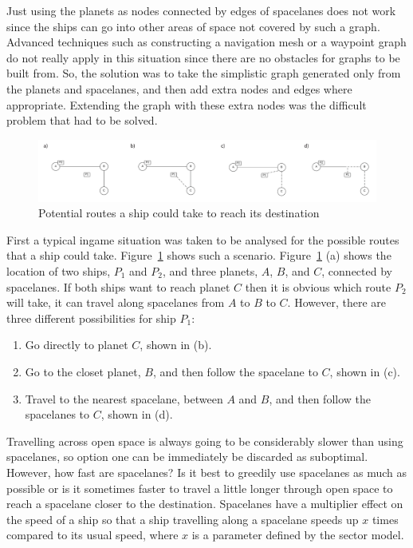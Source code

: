 Just using the planets as nodes connected by edges of spacelanes does not work since the ships can go into other areas of space not covered by such a graph. Advanced techniques such as constructing a navigation mesh or a waypoint graph do not really apply in this situation since there are no obstacles for graphs to be built from. So, the solution was to take the simplistic graph generated only from the planets and spacelanes, and then add extra nodes and edges where appropriate. Extending the graph with these extra nodes was the difficult problem that had to be solved.

\begin{figure}[h!]
	\includegraphics{res/pathfinding/PathFindingExample.pdf}
	\caption{Potential routes a ship could take to reach its destination}
	\label{fig:pathfindingexample}
\end{figure}

First a typical ingame situation was taken to be analysed for the possible routes that a ship could take. Figure~\ref{fig:pathfindingexample} shows such a scenario. Figure~\ref{fig:pathfindingexample} (a) shows the location of two ships, $P_1$ and $P_2$, and three planets, $A$, $B$, and $C$, connected by spacelanes. If both ships want to reach planet $C$ then it is obvious which route $P_2$ will take, it can travel along spacelanes from $A$ to $B$ to $C$. However, there are three different possibilities for ship $P_1$:

\begin{enumerate}
	\item Go directly to planet $C$, shown in (b).
	\item Go to the closet planet, $B$, and then follow the spacelane to $C$, shown in (c).
	\item Travel to the nearest spacelane, between $A$ and $B$, and then follow the spacelanes to $C$, shown in (d).
\end{enumerate}

Travelling across open space is always going to be considerably slower than using spacelanes, so option one can be immediately be discarded as suboptimal. However, how fast are spacelanes? Is it best to greedily use spacelanes as much as possible or is it sometimes faster to travel a little longer through open space to reach a spacelane closer to the destination. Spacelanes have a multiplier effect on the speed of a ship so that a ship travelling along a spacelane speeds up $x$ times compared to its usual speed, where $x$ is a parameter defined by the sector model.

